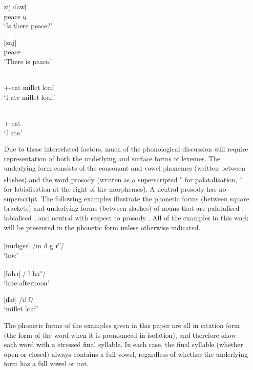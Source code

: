 \ea \label{ex:2:1}
\gll  {[}zij  ɗaw{]}\\
      peace  \textsc{q}\\
\glt  ‘Is there peace?’ 
\z

\ea \label{ex:2:2}
\textup{[zaj]}\\
      peace\\
\glt  ‘There is peace.’ 
\z

\ea \label{ex:2:3}
\label{bkm:nozomdaf}
\\
      {\oneS}+{\PFV}-eat  {millet loaf}\\
\glt  ‘I ate millet loaf.’
\z

\ea \label{ex:2:4}
\gll [n\'{ɔ}-zɔm]\\
      {\oneS}+{\PFV}-eat\\
\glt  ‘I ate.’
\z

Due to these interrelated factors, much of the phonological discussion will require representation of both the underlying and surface forms of lexemes. The underlying form  consists of the consonant and vowel phonemes (written between slashes) and the word prosody (written as a superscripted \textsuperscript{e} for palatalisation, \textsuperscript{o} for labialisation at the right of the morphemes). A neutral prosody has no superscript. The following examples illustrate the phonetic forms (between square brackets) and underlying forms (between slashes) of nouns that are palatalised , labialised , and neutral with respect to prosody . All of the examples in this work will be presented in the phonetic form unless otherwise indicated. 

\ea \label{ex:2:5}
\textup{[mɪdɪgɛr] \hspace{8pt} /m d g r\textsuperscript{e}}\textup{/}\\
\glt  ‘hoe’
\z

\ea \label{ex:2:6}
\textup{[lʊhɔ] \hspace{20pt}  / l ha\textsuperscript{o}}\textup{/}\\
\glt  ‘late afternoon’
\z

\ea \label{ex:2:7}
\textup{[ɗaf] \hspace{25pt} /ɗ f/}\\
\glt  ‘millet loaf’  
\z

The phonetic forms of the examples given in this paper are all in citation form (the form of the word when it is pronounced in isolation), and therefore show each word with a stressed final syllable.  In each case, the final syllable (whether open or closed) always contains a full vowel, regardless of whether the underlying form has a full vowel or not.  

